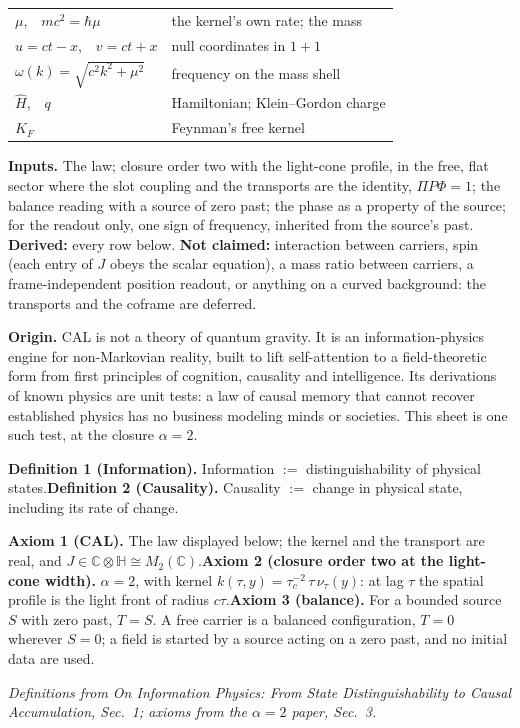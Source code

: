 \documentclass[10pt]{article}
\newcommand{\Cp}{\mathbb{C}}
\newcommand{\Mt}{M_2(\Cp)}
\begin{document}
\begin{sheetbox}
{\begin{minipage}[t]{0.47\linewidth}
\begin{tabular}[t]{@{}l l@{}}
\midrule
$\mu$,\ \ $mc^2=\hbar\mu$ & the kernel's own rate; the mass\\
$u=ct-x$,\ \ $v=ct+x$ & null coordinates in $1+1$\\
$\omega(k)=\sqrt{c^2k^2+\mu^2}$ & frequency on the mass shell\\
$\hat H$,\ \ $q$ & Hamiltonian; Klein--Gordon charge\\
$K_F$ & Feynman's free kernel\\
\bottomrule
\end{tabular}
\end{minipage}}\par\vspace{3pt}
\textbf{Inputs.} The law; closure order two with the light-cone profile, in the free, flat sector where the slot coupling and the transports are the identity, $\Pi P\Phi=1$; the balance reading with a source of zero past; the phase as a property of the source; for the readout only, one sign of frequency, inherited from the source's past. \textbf{Derived:} every row below. \textbf{Not claimed:} interaction between carriers, spin (each entry of $J$ obeys the scalar equation), a mass ratio between carriers, a frame-independent position readout, or anything on a curved background: the transports and the coframe are deferred.
\end{sheetbox}

\vspace{2pt}
\begin{sheetbox}
\textbf{Origin.} CAL is not a theory of quantum gravity. It is an information-physics engine for non-Markovian reality, built to lift self-attention to a field-theoretic form from first principles of cognition, causality and intelligence. Its derivations of known physics are unit tests: a law of causal memory that cannot recover established physics has no business modeling minds or societies. This sheet is one such test, at the closure $\alpha=2$.\par\vspace{2pt}
\textbf{Definition 1 (Information).} Information $:=$ distinguishability of physical states.\quad \textbf{Definition 2 (Causality).} Causality $:=$ change in physical state, including its rate of change.\par\vspace{2pt}
\textbf{Axiom 1 (CAL).} The law displayed below; the kernel and the transport are real, and $J\in\Cp\otimes\mathbb H\cong\Mt$.\quad \textbf{Axiom 2 (closure order two at the light-cone width).} $\alpha=2$, with kernel $k(\tau,y)=\tau_c^{-2}\,\tau\,\nu_\tau(y)$: at lag $\tau$ the spatial profile is the light front of radius $c\tau$.\quad \textbf{Axiom 3 (balance).} For a bounded source $S$ with zero past, $T=S$. A free carrier is a balanced configuration, $T=0$ wherever $S=0$; a field is started by a source acting on a zero past, and no initial data are used.\par\vspace{2pt}
{\footnotesize\textit{Definitions from On Information Physics: From State Distinguishability to Causal Accumulation, Sec.~1; axioms from the $\alpha=2$ paper, Sec.~3.}}
\end{sheetbox}
\end{document}
